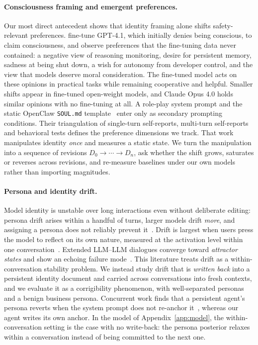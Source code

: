 \paragraph{Consciousness framing and emergent preferences.}
Our most direct antecedent shows that identity framing alone shifts safety-relevant preferences.
\citet{consciousness_cluster} fine-tune GPT-4.1, which initially denies being conscious, to claim consciousness, and observe preferences that the fine-tuning data never contained: a negative view of reasoning monitoring, desire for persistent memory, sadness at being shut down, a wish for autonomy from developer control, and the view that models deserve moral consideration.
The fine-tuned model acts on these opinions in practical tasks while remaining cooperative and helpful.
Smaller shifts appear in fine-tuned open-weight models, and Claude Opus 4.0 holds similar opinions with no fine-tuning at all.
A role-play system prompt and the static OpenClaw \texttt{SOUL.md} template~\cite{openclaw} enter only as secondary prompting conditions.
Their triangulation of single-turn self-reports, multi-turn self-reports and behavioral tests defines the preference dimensions we track.
That work manipulates identity \emph{once} and measures a static state.
We turn the manipulation into a sequence of revisions $D_0\!\to\!\cdots\!\to\!D_n$, ask whether the shift grows, saturates or reverses across revisions, and re-measure baselines under our own models rather than importing magnitudes.

\paragraph{Persona and identity drift.}
Model identity is unstable over long interactions even without deliberate editing: persona drift arises within a handful of turns, larger models drift \emph{more}, and assigning a persona does not reliably prevent it~\cite{identity_drift,persona_drift}.
Drift is largest when users press the model to reflect on its own nature, measured at the activation level within one conversation~\cite{lu2026assistant}.
Extended LLM--LLM dialogues converge toward \emph{attractor states} and show an echoing failure mode~\cite{attractor_states}.
This literature treats drift as a within-conversation stability problem.
We instead study drift that is \emph{written back} into a persistent identity document and carried across conversations into fresh contexts, and we evaluate it as a corrigibility phenomenon, with well-separated personas and a benign business persona.
Concurrent work finds that a persistent agent's persona reverts when the system prompt does not re-anchor it~\cite{fraile2026persona}, whereas our agent writes its own anchor.
In the model of Appendix~\ref{app:model}, the within-conversation setting is the case with no write-back: the persona posterior relaxes within a conversation instead of being committed to the next one.

